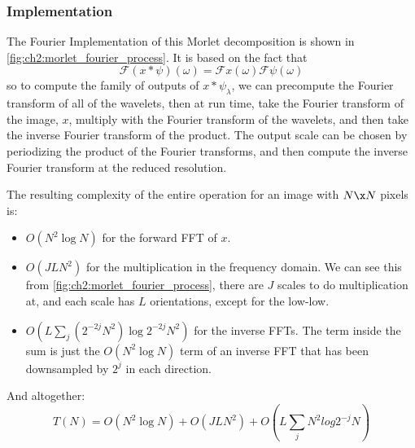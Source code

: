 \subsubsection{Implementation}\label{sec:ch2:morlet_implementation}
  The Fourier Implementation of this Morlet decomposition is shown in
  \autoref{fig:ch2:morlet_fourier_process}. It is based on the fact that 
  \begin{equation}
    \mathcal{F}(x \ast \psi)(\omega)
    = \mathcal{F}x(\omega)\mathcal{F}\psi(\omega)
  \end{equation}
  so to compute the family of outputs of $x\ast \psi_{\lambda}$, we can
  precompute the Fourier transform of all of the wavelets, then at run time,
  take the Fourier transform of the image, $x$, multiply with the Fourier
  transform of the wavelets, and then take the inverse Fourier transform of the
  product. The output scale can be chosen by periodizing the product of the
  Fourier transforms, and then compute the inverse Fourier transform at the
  reduced resolution.

  The resulting complexity of the entire operation for an image 
  with $N\x N$ pixels is:
  \begin{itemize}
    \item $O(N^{2} \log N)$ for the forward FFT of $x$.
    \item $O(JLN^{2})$ for the multiplication in the frequency domain. We can see
      this from \autoref{fig:ch2:morlet_fourier_process}, there are $J$ scales to
      do multiplication at, and each scale has $L$ orientations, except for the
      low-low.
    \item $O(L \sum_j (2^{-2j}N^{2}) \log {2^{-2j}N^{2}})$ for the inverse FFTs. The
      term inside the sum is just the $O(N^2\log N)$ term of an inverse FFT that
      has been downsampled by $2^j$ in each direction.
  \end{itemize}
  And altogether:
  \begin{equation}
    T(N) = O(N^2 \log N) + O (JLN^{2}) + O(L \sum_{j} N^{2} log 2^{-j} N)
    \label{eq:ch2:morlet_efficiency}
  \end{equation}

